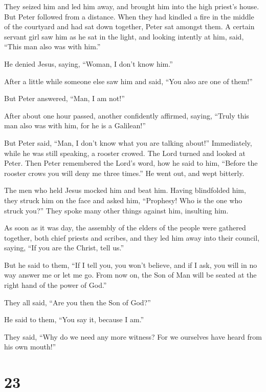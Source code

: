  They seized him and led him away, and brought him into the
high priest's house. But Peter followed from a distance. 
When they had kindled a fire in the middle of the courtyard and had sat
down together, Peter sat amongst them.  A certain servant
girl saw him as he sat in the light, and looking intently at him, said,
``This man also was with him.''

 He denied Jesus, saying, ``Woman, I don't know him.''

 After a little while someone else saw him and said, ``You
also are one of them!''

But Peter answered, ``Man, I am not!''

 After about one hour passed, another confidently affirmed,
saying, ``Truly this man also was with him, for he is a Galilean!''

 But Peter said, ``Man, I don't know what you are talking
about!'' Immediately, while he was still speaking, a rooster crowed.
 The Lord turned and looked at Peter. Then Peter remembered
the Lord's word, how he said to him, ``Before the rooster crows you will
deny me three times.''  He went out, and wept bitterly.

 The men who held Jesus mocked him and beat him.
 Having blindfolded him, they struck him on the face and
asked him, ``Prophesy! Who is the one who struck you?'' 
They spoke many other things against him, insulting him.

 As soon as it was day, the assembly of the elders of the
people were gathered together, both chief priests and scribes, and they
led him away into their council, saying,  ``If you are the
Christ, tell us.''

But he said to them, ``If I tell you, you won't believe, 
and if I ask, you will in no way answer me or let me go. 
From now on, the Son of Man will be seated at the right hand of the
power of God.''

 They all said, ``Are you then the Son of God?''

He said to them, ``You say it, because I am.''

 They said, ``Why do we need any more witness? For we
ourselves have heard from his own mouth!''

\hypertarget{section-13}{%
\section{23}\label{section-13}}

